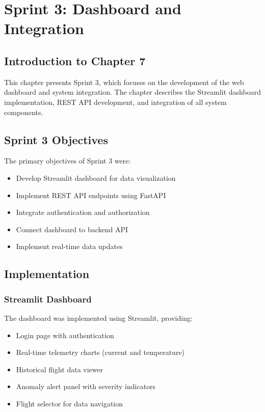 \chapter{Sprint 3: Dashboard and Integration}

\section*{Introduction to Chapter 7}

This chapter presents Sprint 3, which focuses on the development of the web dashboard and system integration. The chapter describes the Streamlit dashboard implementation, REST API development, and integration of all system components.

\section{Sprint 3 Objectives}

The primary objectives of Sprint 3 were:
\begin{itemize}
    \item Develop Streamlit dashboard for data visualization
    \item Implement REST API endpoints using FastAPI
    \item Integrate authentication and authorization
    \item Connect dashboard to backend API
    \item Implement real-time data updates
\end{itemize}

\section{Implementation}

\subsection{Streamlit Dashboard}

The dashboard was implemented using Streamlit, providing:
\begin{itemize}
    \item Login page with authentication
    \item Real-time telemetry charts (current and temperature)
    \item Historical flight data viewer
    \item Anomaly alert panel with severity indicators
    \item Flight selector for data navigation
\end{itemize}

